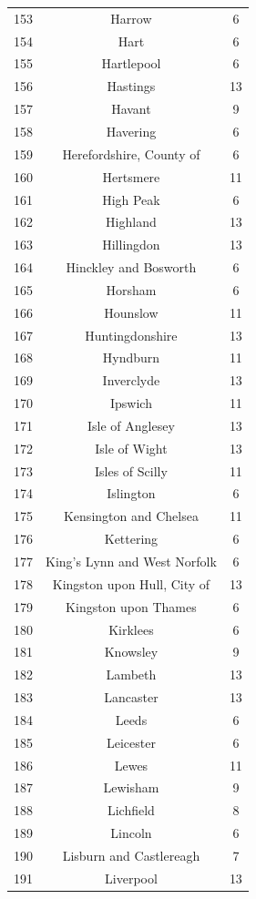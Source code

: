 \documentclass[Royal,times,sageh]{sagej}
\begin{document}
\begin{table}[!htbp]
\begin{tabular}{@{\extracolsep{5pt}} ccc}
153 & Harrow & 6 \\ 
154 & Hart & 6 \\ 
155 & Hartlepool & 6 \\ 
156 & Hastings & 13 \\ 
157 & Havant & 9 \\ 
158 & Havering & 6 \\ 
159 & Herefordshire, County of & 6 \\ 
160 & Hertsmere & 11 \\ 
161 & High Peak & 6 \\ 
162 & Highland & 13 \\ 
163 & Hillingdon & 13 \\ 
164 & Hinckley and Bosworth & 6 \\ 
165 & Horsham & 6 \\ 
166 & Hounslow & 11 \\ 
167 & Huntingdonshire & 13 \\ 
168 & Hyndburn & 11 \\ 
169 & Inverclyde & 13 \\ 
170 & Ipswich & 11 \\ 
171 & Isle of Anglesey & 13 \\ 
172 & Isle of Wight & 13 \\ 
173 & Isles of Scilly & 11 \\ 
174 & Islington & 6 \\ 
175 & Kensington and Chelsea & 11 \\ 
176 & Kettering & 6 \\ 
177 & King's Lynn and West Norfolk & 6 \\ 
178 & Kingston upon Hull, City of & 13 \\ 
179 & Kingston upon Thames & 6 \\ 
180 & Kirklees & 6 \\ 
181 & Knowsley & 9 \\ 
182 & Lambeth & 13 \\ 
183 & Lancaster & 13 \\ 
184 & Leeds & 6 \\ 
185 & Leicester & 6 \\ 
186 & Lewes & 11 \\ 
187 & Lewisham & 9 \\ 
188 & Lichfield & 8 \\ 
189 & Lincoln & 6 \\ 
190 & Lisburn and Castlereagh & 7 \\ 
191 & Liverpool & 13 \\ 

\end{tabular}
\end{table}
\end{document}
